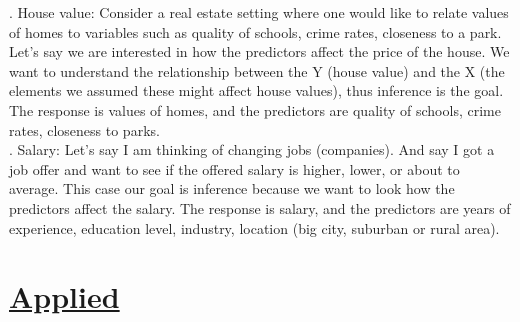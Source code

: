 \documentclass{article}
\begin{document}
\indent{}. House value: Consider a real estate setting where one would like to relate values of homes to variables such as quality of schools, crime rates, closeness to a park. Let's say we are interested in how the predictors affect the price of the house. We want to understand the relationship between the Y (house value) and the X (the elements we assumed these might affect house values), thus inference is the goal. The response is values of homes, and the predictors are quality of schools, crime rates, closeness to parks. \\
\indent{}. Salary: Let's say I am thinking of changing jobs (companies). And say I got a job offer and want to see if the offered salary is higher, lower, or about to average. This case our goal is inference because we want to look how the predictors affect the salary. The response is salary, and the predictors are years of experience, education level, industry, location (big city, suburban or rural area).

\section*{\underline{Applied}}
\end{document}
